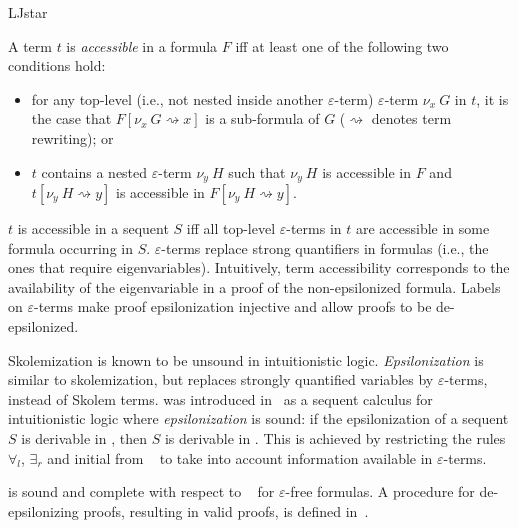 \begin{entry}{LJstar}
\begin{clarifications}
A term $t$ is \emph{accessible} in a formula $F$ iff at least one of the
following two conditions hold: 
\begin{itemize}
  \item for any top-level (i.e., not nested inside another $\varepsilon$-term)
  $\varepsilon$-term $\nu_x~G$ in $t$, it is the case that $F[\nu_x~G
  \rightsquigarrow x]$ is a sub-formula of $G$ ($\rightsquigarrow$ denotes term
  rewriting); or

  \item $t$ contains a nested $\varepsilon$-term $\nu_y~H$ such that $\nu_y~H$
  is accessible in $F$ and $t[\nu_y~H \rightsquigarrow y]$ is accessible in
  $F[\nu_y~H \rightsquigarrow y]$.
\end{itemize}
$t$ is accessible in a sequent $S$ iff all top-level
$\varepsilon$-terms in $t$ are accessible in some formula occurring in $S$.
%
$\varepsilon$-terms replace strong quantifiers in formulas (i.e., the ones
that require eigenvariables).
Intuitively, term accessibility corresponds to the availability of the
eigenvariable in a proof of the non-epsilonized formula.
%
Labels on $\varepsilon$-terms make proof epsilonization injective and allow proofs to be de-epsilonized.
\end{clarifications}

\begin{history}
Skolemization is known to be unsound in intuitionistic logic. \emph{Epsilonization} is similar to skolemization, but replaces strongly quantified variables by $\varepsilon$-terms, instead of Skolem terms. \LJstar was introduced in~\cite{Reis2016} as a sequent calculus for
intuitionistic logic where \emph{epsilonization} is sound: if the
epsilonization of a sequent $S$ is derivable in \LJstar, then $S$ is derivable in \LJ.
%
This is achieved by restricting the rules $\forall_l$, $\exists_r$ and initial
from \LJ~ to take into account information available in
$\varepsilon$-terms.
\end{history}

\begin{technicalities}
\LJstar is sound and complete with respect to \LJ~ for
$\varepsilon$-free formulas. A procedure for de-epsilonizing \LJstar proofs, resulting in valid \LJ proofs, is
defined in~\cite{Reis2016}.
\end{technicalities}

\end{entry}
